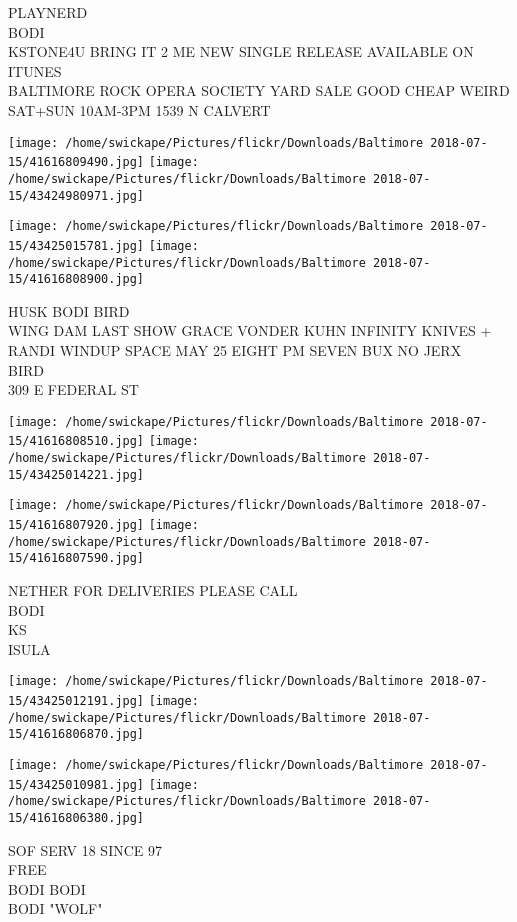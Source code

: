 \documentclass[10pt,letterpaper]{article}
\begin{document}
PLAYNERD\\
BODI\\
KSTONE4U BRING IT 2 ME NEW SINGLE RELEASE AVAILABLE ON ITUNES\\
BALTIMORE ROCK OPERA SOCIETY YARD SALE GOOD CHEAP WEIRD SAT+SUN 10AM{-}3PM 1539 N CALVERT
\pagebreak

\texttt{[image: /home/swickape/Pictures/flickr/Downloads/Baltimore 2018-07-15/41616809490.jpg]}
\texttt{[image: /home/swickape/Pictures/flickr/Downloads/Baltimore 2018-07-15/43424980971.jpg]}

\texttt{[image: /home/swickape/Pictures/flickr/Downloads/Baltimore 2018-07-15/43425015781.jpg]}
\texttt{[image: /home/swickape/Pictures/flickr/Downloads/Baltimore 2018-07-15/41616808900.jpg]}

HUSK BODI BIRD\\
WING DAM LAST SHOW GRACE VONDER KUHN INFINITY KNIVES + RANDI WINDUP SPACE MAY 25 EIGHT PM SEVEN BUX NO JERX\\
BIRD\\
309 E FEDERAL ST
\pagebreak

\texttt{[image: /home/swickape/Pictures/flickr/Downloads/Baltimore 2018-07-15/41616808510.jpg]}
\texttt{[image: /home/swickape/Pictures/flickr/Downloads/Baltimore 2018-07-15/43425014221.jpg]}

\texttt{[image: /home/swickape/Pictures/flickr/Downloads/Baltimore 2018-07-15/41616807920.jpg]}
\texttt{[image: /home/swickape/Pictures/flickr/Downloads/Baltimore 2018-07-15/41616807590.jpg]}

NETHER FOR DELIVERIES PLEASE CALL\\
BODI\\
KS\\
ISULA
\pagebreak

\texttt{[image: /home/swickape/Pictures/flickr/Downloads/Baltimore 2018-07-15/43425012191.jpg]}
\texttt{[image: /home/swickape/Pictures/flickr/Downloads/Baltimore 2018-07-15/41616806870.jpg]}

\texttt{[image: /home/swickape/Pictures/flickr/Downloads/Baltimore 2018-07-15/43425010981.jpg]}
\texttt{[image: /home/swickape/Pictures/flickr/Downloads/Baltimore 2018-07-15/41616806380.jpg]}

SOF SERV 18 SINCE 97\\
FREE\\
BODI BODI\\
BODI "WOLF"
\pagebreak
\end{document}
